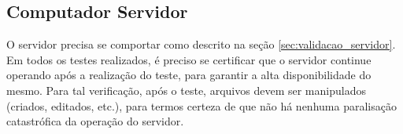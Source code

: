 \subsection{Computador Servidor}
\label{sec:metodo_servidor}

O servidor precisa se comportar como descrito na seção \ref{sec:validacao_servidor}. Em todos os testes realizados, é preciso se certificar que o servidor continue operando após a realização do teste, para garantir a alta disponibilidade do mesmo. Para tal verificação, após o teste, arquivos devem ser manipulados (criados, editados, etc.), para termos certeza de que não há nenhuma paralisação catastrófica da operação do servidor.
